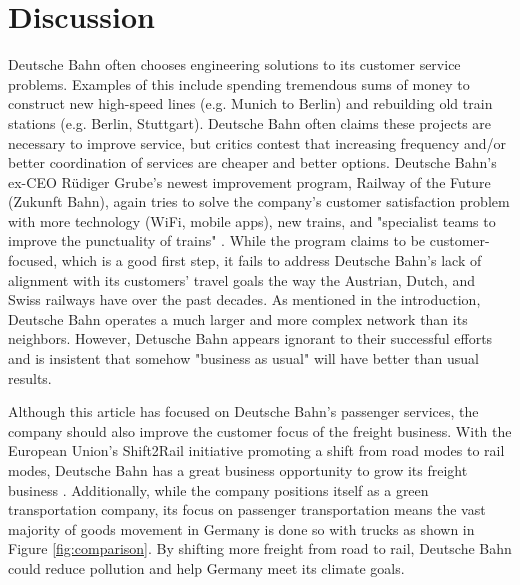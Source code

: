 \documentclass{article}
\begin{document}
\section{Discussion}
Deutsche Bahn often chooses engineering solutions to its customer service problems. Examples of this include spending tremendous sums of money to construct new high-speed lines (e.g. Munich to Berlin) and rebuilding old train stations (e.g. Berlin, Stuttgart). Deutsche Bahn often claims these projects are necessary to improve service, but critics contest that increasing frequency and/or better coordination of services are cheaper and better options. Deutsche Bahn's ex-CEO Rüdiger Grube's newest improvement program, Railway of the Future (Zukunft Bahn), again tries to solve the company's customer satisfaction problem with more technology (WiFi, mobile apps), new trains, and "specialist teams to improve the punctuality of trains" \citep{db-programm}. While the program claims to be customer-focused, which is a good first step, it fails to address Deutsche Bahn's lack of alignment with its customers' travel goals the way the Austrian, Dutch, and Swiss railways have over the past decades. As mentioned in the introduction, Deutsche Bahn operates a much larger and more complex network than its neighbors. However, Detusche Bahn appears ignorant to their successful efforts and is insistent that somehow "business as usual" will have better than usual results.

Although this article has focused on Deutsche Bahn's passenger services, the company should also improve the customer focus of the freight business. With the European Union's Shift2Rail initiative promoting a shift from road modes to rail modes, Deutsche Bahn has a great business opportunity to grow its freight business \citep{shift2rail}. Additionally, while the company positions itself as a green transportation company, its focus on passenger transportation means the vast majority of goods movement in Germany is done so with trucks as shown in Figure \ref{fig:comparison}. By shifting more freight from road to rail, Deutsche Bahn could reduce pollution and help Germany meet its climate goals.
\end{document}
